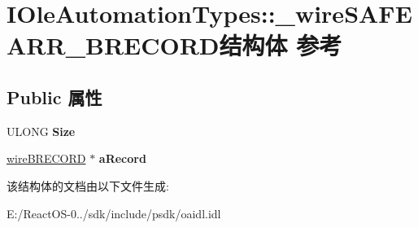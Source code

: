 \hypertarget{struct_i_ole_automation_types_1_1__wire_s_a_f_e_a_r_r___b_r_e_c_o_r_d}{}\section{I\+Ole\+Automation\+Types\+:\+:\+\_\+wire\+S\+A\+F\+E\+A\+R\+R\+\_\+\+B\+R\+E\+C\+O\+R\+D结构体 参考}
\label{struct_i_ole_automation_types_1_1__wire_s_a_f_e_a_r_r___b_r_e_c_o_r_d}
\subsection*{Public 属性}
\begin{DoxyCompactItemize}
\item 
\mbox{\label{struct_i_ole_automation_types_1_1__wire_s_a_f_e_a_r_r___b_r_e_c_o_r_d_af0882af0046389afa2212a6547059419}} 
U\+L\+O\+NG {\bfseries Size}
\item 
\mbox{\label{struct_i_ole_automation_types_1_1__wire_s_a_f_e_a_r_r___b_r_e_c_o_r_d_aa7c613b99c657b9b11d8c4b5f9b7b4b9}} 
\hyperlink{struct_i_ole_automation_types_1_1__wire_b_r_e_c_o_r_d}{wire\+B\+R\+E\+C\+O\+RD} $\ast$ {\bfseries a\+Record}
\end{DoxyCompactItemize}


该结构体的文档由以下文件生成\+:\begin{DoxyCompactItemize}
\item 
E\+:/\+React\+O\+S-\/0../sdk/include/psdk/oaidl.\+idl\end{DoxyCompactItemize}
